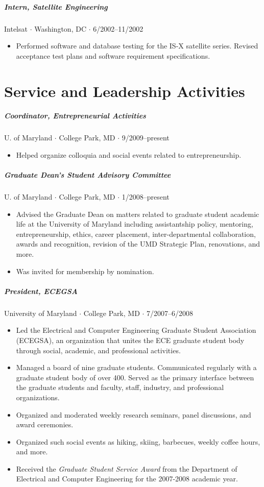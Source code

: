 \documentclass[10pt,letterpaper]{article}
\begin{document}
\subparagraph{Intern, Satellite Engineering}
Intelsat $\cdot$ Washington, DC $\cdot$ 6/2002--11/2002
\begin{itemize}
\item Performed software and database testing for the IS-X satellite series. Revised acceptance test plans and software requirement specifications.
\end{itemize}

\section*{Service and Leadership Activities}

\subparagraph{Coordinator, Entrepreneurial Activities}
U. of Maryland $\cdot$ College Park, MD $\cdot$ 9/2009--present
\begin{itemize}
\item Helped organize colloquia and social events related to entrepreneurship.
\end{itemize}
	
\subparagraph{Graduate Dean's Student Advisory Committee}
U. of Maryland $\cdot$ College Park, MD $\cdot$ 1/2008--present
\begin{itemize}
\item Advised the Graduate Dean on matters related to graduate student academic life at the University of Maryland including assistantship policy, mentoring, entrepreneurship, ethics, career placement, inter-departmental collaboration, awards and recognition, revision of the UMD Strategic Plan, renovations, and more. 
\item Was invited for membership by nomination.
\end{itemize}

\subparagraph{President, ECEGSA}
University of Maryland $\cdot$ College Park, MD $\cdot$ 7/2007--6/2008
\begin{itemize}
\item Led the Electrical and Computer Engineering Graduate Student Association (ECEGSA), an organization that unites the ECE graduate student body through social, academic, and professional activities.
\item Managed a board of nine graduate students. Communicated regularly with a graduate student body of over 400. Served as the primary interface between the graduate students and faculty, staff, industry, and professional organizations.
\item Organized and moderated weekly research seminars, panel discussions, and award ceremonies.
\item Organized such social events as hiking, skiing, barbecues, weekly coffee hours, and more.
\item Received the \textit{Graduate Student Service Award} from the Department of Electrical and Computer Engineering for the 2007-2008 academic year.
\end{itemize}
\end{document}
